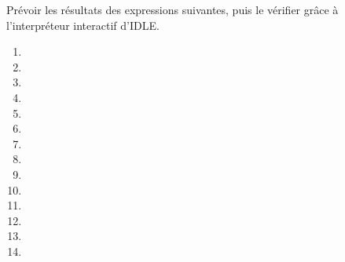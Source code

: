 Prévoir les résultats des expressions suivantes, puis le vérifier grâce à l'interpréteur interactif d'IDLE.

  \begin{enumerate}[label=\emph{\alph*)}]
    \item {}
    \item {}
    \item {}
    \item \pyv{(,)}
    \item \pyv{()}
    \item \pyv{()+()}
    \item \pyv{()+() == ()}
    \item {}
    \item {}
    \item {}
    \item {}
    \item {}
    \item {}
    \item {}
  \end{enumerate}
